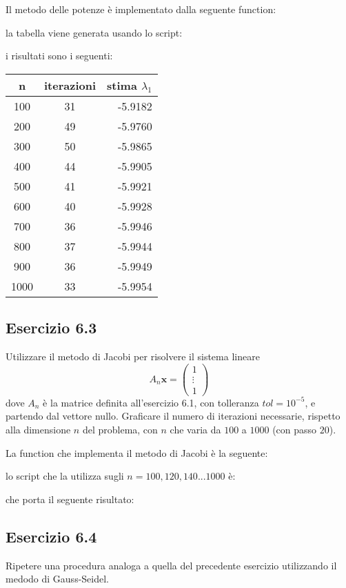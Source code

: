 \par
Il metodo delle potenze è implementato dalla seguente function:

la tabella viene generata usando lo script:

i risultati sono i seguenti:
\begin{tabular}{|c|c|r|}
	\hline
	n & iterazioni & stima $\lambda_1 $\\
	\hline
     	100  &  31  &  -5.9182  \\
     	200  &  49  &  -5.9760  \\
     	300  &  50  &  -5.9865  \\
     	400  &  44  &  -5.9905  \\
     	500  &  41  &  -5.9921  \\
     	600  &  40  &  -5.9928  \\
     	700  &  36  &  -5.9946  \\
     	800  &  37  &  -5.9944  \\
     	900  &  36  &  -5.9949  \\
    	1000  &  33  &  -5.9954  \\
    	\hline
\end{tabular}


	\subsection{Esercizio 6.3}

Utilizzare il metodo di Jacobi per risolvere il sistema lineare
\begin{equation*}
	A_n \mathbf{x} = \begin{pmatrix} 1 \\ \vdots \\ 1 \end{pmatrix}
\end{equation*}
dove $A_n$ è la matrice definita all'esercizio 6.1, con tolleranza $tol = 10^{-5}$, e partendo dal vettore nullo. Graficare il numero di iterazioni necessarie, rispetto alla dimensione $n$ del problema, con $n$ che varia da $100$ a $1000$ (con passo $20$).

La function che implementa il metodo di Jacobi è la seguente:

lo script che la utilizza sugli $n = 100, 120, 140 ... 1000$ è:

che porta il seguente risultato:


	\subsection{Esercizio 6.4}
Ripetere una procedura analoga a quella del precedente esercizio utilizzando il medodo di Gauss-Seidel.

